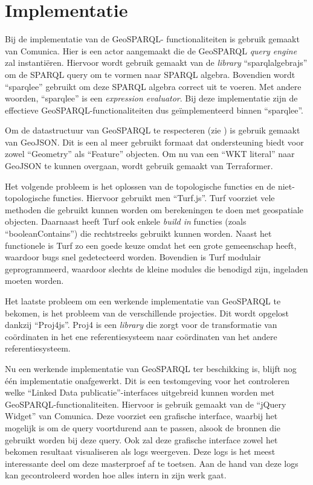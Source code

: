 \documentclass[twocolumn]{phdsymp} %
\begin{document}
\section{Implementatie}
Bij de implementatie van de GeoSPARQL- functionaliteiten is gebruik gemaakt van Comunica. Hier is een actor aangemaakt die de GeoSPARQL \textit{query engine} zal instantiëren. Hiervoor wordt gebruik gemaakt van de \textit{library} ``sparqlalgebrajs'' om de SPARQL query om te vormen naar SPARQL algebra. Bovendien wordt ``sparqlee'' gebruikt om deze SPARQL algebra correct uit te voeren. Met andere woorden, ``sparqlee'' is een \textit{expression evaluator}. Bij deze implementatie zijn de effectieve GeoSPARQL-functionaliteiten dus geïmplementeerd binnen ``sparqlee''. 

Om de datastructuur van GeoSPARQL te respecteren (zie ) is gebruik gemaakt van GeoJSON. Dit is een al meer gebruikt formaat dat ondersteuning biedt voor zowel ``Geometry'' als ``Feature'' objecten. Om nu van een ``WKT literal'' naar GeoJSON te kunnen overgaan, wordt gebruik gemaakt van Terraformer. 

Het volgende probleem is het oplossen van de topologische functies en de niet-topologische functies. Hiervoor gebruikt men ``Turf.js''. Turf voorziet vele methoden die gebruikt kunnen worden om berekeningen te doen met geospatiale objecten. Daarnaast heeft Turf ook enkele \textit{build in} functies (zoals ``booleanContains'') die rechtstreeks gebruikt kunnen worden. Naast het functionele is Turf zo een goede keuze omdat het een grote gemeenschap heeft, waardoor bugs snel gedetecteerd worden. Bovendien is Turf modulair geprogrammeerd, waardoor slechts de kleine modules die benodigd zijn, ingeladen moeten worden. 

Het laatste probleem om een werkende implementatie van GeoSPARQL te bekomen, is het probleem van de verschillende projecties. Dit wordt opgelost dankzij ``Proj4js''. Proj4 is een \textit{library} die zorgt voor de transformatie van coördinaten in het ene referentiesysteem naar coördinaten van het andere referentiesysteem. 

Nu een werkende implementatie van GeoSPARQL ter beschikking is, blijft nog één implementatie onafgewerkt. Dit is een testomgeving voor het controleren welke ``Linked Data publicatie''-interfaces uitgebreid kunnen worden met GeoSPARQL-functionaliteiten. Hiervoor is gebruik gemaakt van de ``jQuery Widget'' van Comunica. Deze voorziet een grafische interface, waarbij het mogelijk is om de query voortdurend aan te passen, alsook de bronnen die gebruikt worden bij deze query. Ook zal deze grafische interface zowel het bekomen resultaat visualiseren als logs weergeven. Deze logs is het meest interessante deel om deze masterproef af te toetsen. Aan de hand van deze logs kan gecontroleerd worden hoe alles intern in zijn werk gaat. 
\end{document}
